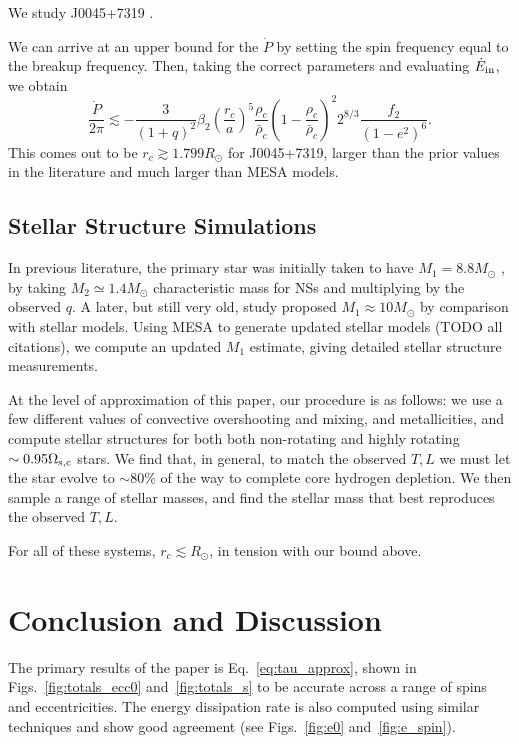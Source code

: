 \documentclass[
        fleqn,
        usenatbib,
    ]{mnras}
\begin{document}
We study J0045+7319 \citep{bell1995psr}.

We can arrive at an upper bound for the $\dot{P}$ by setting the spin frequency
equal to the breakup frequency. Then, taking the correct parameters and
evaluating $\dot{E}_{\rm in}$, we obtain
\begin{equation}
    \frac{\dot{P}}{2\pi} \lesssim
        -\frac{3}{(1 + q)^2}\beta_2 \left(\frac{r_c}{a}\right)^5
        \frac{\rho_c}{\bar{\rho}_c} \left(1 -
        \frac{\rho_c}{\bar{\rho}_c}\right)^2 2^{8/3}\frac{f_2}{(1 - e^2)^6}.
\end{equation}
This comes out to be $r_c \gtrsim 1.799R_{\odot}$ for J0045+7319, larger than
the prior values in the literature and much larger than MESA models.

\subsection{Stellar Structure Simulations}

In previous literature, the primary star was initially taken to have $M_1 =
8.8M_{\odot}$ \citep{kumar1998,lai1996}, by taking $M_2 \simeq 1.4M_{\odot}$
characteristic mass for NSs and multiplying by the observed $q$. A later, but
still very old, study proposed $M_1 \approx 10M_{\odot}$ by comparison with
stellar models. Using MESA to generate updated stellar models (TODO all
citations), we compute an updated $M_1$ estimate, giving detailed stellar
structure measurements.

At the level of approximation of this paper, our procedure is as follows: we
use a few different values of convective overshooting and mixing, and
metallicities, and compute stellar structures for both both non-rotating and
highly rotating $\sim 0.95\Omega_{\rm s, c}$ stars. We find that, in general, to
match the observed $T, L$ we must let the star evolve to $\sim 80\%$ of the way
to complete core hydrogen depletion. We then sample a range of stellar masses,
and find the stellar mass that best reproduces the observed $T, L$.

For all of these systems, $r_c \lesssim R_{\odot}$, in tension with our bound
above.

\section{Conclusion and Discussion}\label{s:disc}

The primary results of the paper is Eq.~\eqref{eq:tau_approx}, shown in
Figs.~\ref{fig:totals_ecc0} and~\ref{fig:totals_s} to be accurate across a range
of spins and eccentricities. The energy dissipation rate is also computed using
similar techniques and show good agreement (see Figs.~\ref{fig:e0}
and~\ref{fig:e_spin}).
\end{document}

